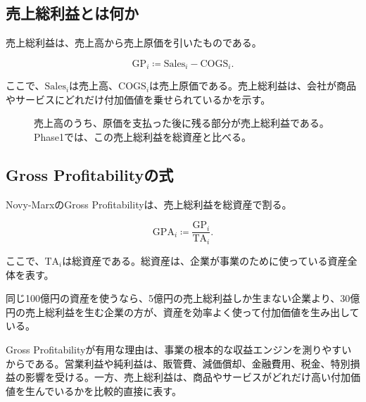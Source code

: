 \documentclass[11pt,a4paper]{article}
\newcommand{\TA}{\mathrm{TA}}
\newcommand{\GP}{\mathrm{GP}}
\newcommand{\COGS}{\mathrm{COGS}}
\begin{document}
\subsection{売上総利益とは何か}

売上総利益は、売上高から売上原価を引いたものである。

\begin{equation}
\GP_i \coloneqq \mathrm{Sales}_i - \COGS_i.
\label{eq:gross-profit}
\end{equation}

ここで、$\mathrm{Sales}_i$は売上高、$\COGS_i$は売上原価である。売上総利益は、会社が商品やサービスにどれだけ付加価値を乗せられているかを示す。

\begin{figure}[tbp]
\centering
{}
\caption{売上高のうち、原価を支払った後に残る部分が売上総利益である。Phase1では、この売上総利益を総資産と比べる。}
\label{fig:gross-profit}
\end{figure}

\subsection{Gross Profitabilityの式}

Novy-MarxのGross Profitabilityは、売上総利益を総資産で割る。

\begin{equation}
\mathrm{GPA}_i \coloneqq \frac{\GP_i}{\TA_i}.
\label{eq:gpa}
\end{equation}

ここで、$\TA_i$は総資産である。総資産は、企業が事業のために使っている資産全体を表す。

\begin{defbox}[直感]
同じ100億円の資産を使うなら、5億円の売上総利益しか生まない企業より、30億円の売上総利益を生む企業の方が、資産を効率よく使って付加価値を生み出している。
\end{defbox}

Gross Profitabilityが有用な理由は、事業の根本的な収益エンジンを測りやすいからである。営業利益や純利益は、販管費、減価償却、金融費用、税金、特別損益の影響を受ける。一方、売上総利益は、商品やサービスがどれだけ高い付加価値を生んでいるかを比較的直接に表す。
\end{document}
